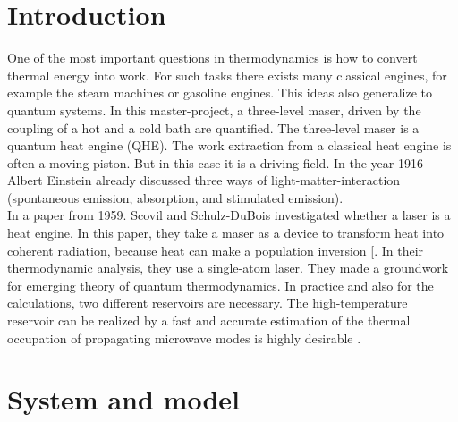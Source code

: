 \documentclass[12pt,a4paper]{article}
\begin{document}
\section{Introduction}
One of the most important questions in thermodynamics is how to convert
thermal energy into work. For such tasks there exists many classical engines, for
example the steam machines or gasoline engines. %
This ideas also generalize to quantum systems.
In this master-project, a three-level maser, driven by the coupling of a hot and a cold bath are quantified.
The three-level maser is a quantum heat engine (QHE). The work extraction from a classical heat engine is often a moving piston. But in this case
it is a driving field. In the year 1916 Albert Einstein already discussed three ways of
light-matter-interaction (spontaneous emission, absorption, and stimulated
emission)\cite{Li2017}. \\In a paper from 1959.  Scovil and Schulz-DuBois investigated whether a laser is a heat engine. In this paper, they take a maser as a device to transform heat into coherent radiation, because heat can make a population inversion [\cite{Scovil1959}.
In their thermodynamic analysis, they use a single-atom laser. They made a
groundwork for emerging theory of quantum thermodynamics. In practice and also for the calculations, two different reservoirs are necessary. The high-temperature reservoir can be
realized by a fast and accurate
estimation of the thermal occupation of propagating microwave modes is highly desirable \cite{Scigliuzzo2020}.

\newpage

\section{System and model}
\end{document}
